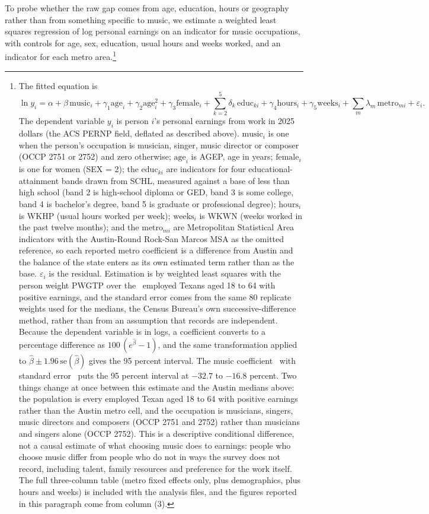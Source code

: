To probe whether the raw gap comes from age, education, hours or geography
rather than from something specific to music, we estimate a weighted least
squares regression of log personal earnings on an indicator for music
occupations, with controls for age, sex, education, usual hours and weeks
worked, and an indicator for each metro area.\footnote{The fitted equation is
\[
\ln y_i = \alpha + \beta\,\mathrm{music}_i
  + \gamma_1 \mathrm{age}_i + \gamma_2 \mathrm{age}_i^{2}
  + \gamma_3 \mathrm{female}_i
  + \sum_{k=2}^{5}\delta_k\,\mathrm{educ}_{ki}
  + \gamma_4 \mathrm{hours}_i + \gamma_5 \mathrm{weeks}_i
  + \sum_{m}\lambda_m\,\mathrm{metro}_{mi} + \varepsilon_i .
\]
The dependent variable \(y_i\) is person \(i\)'s personal earnings from work
in 2025 dollars (the ACS PERNP field, deflated as described above).
\(\mathrm{music}_i\) is one when the person's occupation is musician, singer,
music director or composer (OCCP 2751 or 2752) and zero otherwise;
\(\mathrm{age}_i\) is AGEP, age in years; \(\mathrm{female}_i\) is one for
women (SEX = 2); the \(\mathrm{educ}_{ki}\) are indicators for four
educational-attainment bands drawn from SCHL, measured against a base of
less than high school (band 2 is high-school diploma or GED, band 3 is some
college, band 4 is bachelor's degree, band 5 is graduate or professional
degree); \(\mathrm{hours}_i\) is WKHP (usual hours worked per week);
\(\mathrm{weeks}_i\) is WKWN (weeks worked in the past twelve months); and
the \(\mathrm{metro}_{mi}\) are Metropolitan Statistical Area indicators
with the Austin-Round Rock-San Marcos MSA as the omitted reference, so each
reported metro coefficient is a difference from Austin and the balance of
the state enters as its own estimated term rather than as the base.
\(\varepsilon_i\) is the residual. Estimation is by weighted least squares
with the person weight PWGTP over the \NPumsRegN\ employed Texans aged 18 to
64 with positive earnings, and the standard error comes from the same 80
replicate weights used for the medians, the Census Bureau's own
successive-difference method, rather than from an assumption that records
are independent. Because the dependent variable is in logs, a coefficient
converts to a percentage difference as \(100\,(e^{\hat\beta} - 1)\), and the
same transformation applied to \(\hat\beta \pm 1.96\,\mathrm{se}(\hat\beta)\)
gives the 95 percent interval. The music coefficient
\NPumsRegMusicCoef\ with standard error \NPumsRegMusicSe\ puts the 95 percent
interval at \(-32.7\) to \(-16.8\) percent. Two things change at once between
this estimate and the Austin medians above: the population is every employed
Texan aged 18 to 64 with positive earnings rather than the Austin metro cell,
and the occupation is musicians, singers, music directors and composers (OCCP
2751 and 2752) rather than musicians and singers alone (OCCP 2752). This is a
descriptive conditional difference, not a causal estimate of what choosing
music does to earnings: people who choose music differ from people who do
not in ways the survey does not record, including talent, family resources
and preference for the work itself. The full three-column table (metro fixed
effects only, plus demographics, plus hours and weeks) is included with the
analysis files, and the
figures reported in this paragraph come from column (3).}
